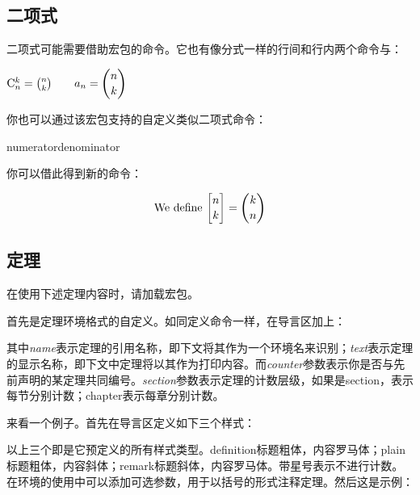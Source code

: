 \subsection{二项式}
\label{subsec:binom}
二项式可能需要借助宏包的命令。它也有像分式一样的行间和行内两个命令与：

\begin{codeshow}
$\mathrm{C}_n^k=\binom{n}{k}
\qquad a_n=\dbinom{n}{k}$
\end{codeshow}

你也可以通过该宏包支持的自定义类似二项式命令：
\begin{latex}
{numerator}{denominator}
\newcommand{\Bfrac}[2]{\genfrac{[}{]}{0pt}{}{#1}{#2}}
\end{latex}

你可以借此得到新的命令：
\begin{codeshow}
\[\text{We define }\Bfrac{n}{k}=\binom{k}{n}\]
\end{codeshow}

\subsection{定理}
在使用下述定理内容时，请加载宏包。

首先是定理环境格式的自定义。如同定义命令一样，在导言区加上：
\begin{latex}
\newtheorem{envname}[counter]{text}[section]
\end{latex}

其中\textit{name}表示定理的引用名称，即下文将其作为一个环境名来识别；\textit{text}表示定理的显示名称，即下文中定理将以其作为打印内容。而\textit{counter}参数表示你是否与先前声明的某定理共同编号。\textit{section}参数表示定理的计数层级，如果是section，表示每节分别计数；chapter表示每章分别计数。

来看一个例子。首先在导言区定义如下三个样式：
\begin{latex}
\theoremstyle{definition}\newtheorem{laws}{Law}[section]
\theoremstyle{plain}\newtheorem{ju}[laws]{Jury}
\theoremstyle{remark}\newtheorem*{marg}{Margaret}
\end{latex}

以上三个即是它预定义的所有样式类型。definition标题粗体，内容罗马体；plain标题粗体，内容斜体；remark标题斜体，内容罗马体。带星号表示不进行计数。在环境的使用中可以添加可选参数，用于以括号的形式注释定理。然后这是示例：

